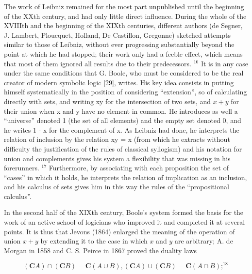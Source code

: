 The work of Leibniz remained for the most part unpublished until the beginning of the XXth century, and had only little direct influence. During the whole of the XVIIIth and the beginning of the XIXth centuries, different authors (de Segner, J. Lambert, Ploucquet, Holland, De Castillon, Gregonne) sketched attempts similar to those of Leibniz, without ever progressing substantially beyond the point at which he had stopped; their work only had a feeble effect, which means that most of them ignored all results due to their predecessors. \(^{16}\) It is in any case under the same conditions that G. Boole, who must be considered to be the real creator of modern symbolic logic {[}29{]}, writes. His key idea consists in putting himself systematically in the position of considering ``extension'', so of calculating directly with sets, and writing xy for the intersection of two sets, and \(x + y\) for their union when x and y have no element in common. He introduces as well a ``universe'' denoted 1 (the set of all elements) and the empty set denoted 0, and he writes 1 - x for the complement of x. As Leibniz had done, he interprets the relation of inclusion by the relation xy = x (from which he extracts without difficulty the justification of the rules of classical syllogism) and his notation for union and complements gives his system a flexibility that was missing in his forerunners. \(^{17}\) Furthermore, by associating with each proposition the set of ``cases'' in which it holds, he interprets the relation of implication as an inclusion, and his calculus of sets gives him in this way the rules of the ``propositional calculus''.

In the second half of the XIXth century, Boole's system formed the basis for the work of an active school of logicians who improved it and completed it at several points. It is thus that Jevons (1864) enlarged the meaning of the operation of union \(x + y\) by extending it to the case in which \(x\) and \(y\) are arbitrary; A. de Morgan in 1858 and C. S. Peirce in 1867 proved the duality laws

\[
(\mathbf {C} A) \cap (\mathbf {C} B) = \mathbf {C} (A \cup B), (\mathbf {C} A) \cup (\mathbf {C} B) = \mathbf {C} (A \cap B); ^{18}
\]

